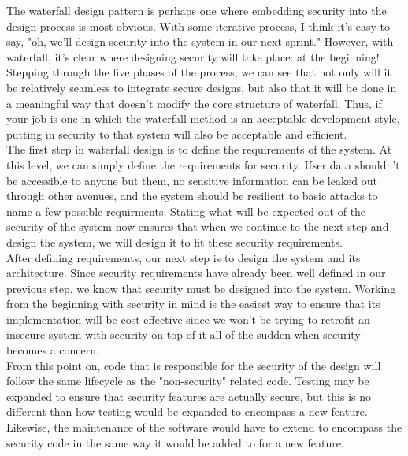 




The waterfall design pattern is perhaps one where embedding security into the design process is most obvious. With some iterative process, I think it's easy to say, "oh, we'll design security into the system in our next sprint." However, with waterfall, it's clear where designing security will take place: at the beginning! Stepping through the five phases of the process, we can see that not only will it be relatively seamless to integrate secure designs, but also that it will be done in a meaningful way that doesn't modify the core structure of waterfall. Thus, if your job is one in which the waterfall method is an acceptable development style, putting in security to that system will also be acceptable and efficient. \\

The first step in waterfall design is to define the requirements of the system. At this level, we can simply define the requirements for security. User data shouldn't be accessible to anyone but them, no sensitive information can be leaked out through other avenues, and the system should be resilient to basic attacks to name a few possible requirments. Stating what will be expected out of the security of the system now ensures that when we continue to the next step and design the system, we will design it to fit these security requirements. \\

After defining requirements, our next step is to design the system and its architecture. Since security requirements have already been well defined in our previous step, we know that security must be designed into the system. Working from the beginning with security in mind is the easiest way to ensure that its implementation will be cost effective since we won't be trying to retrofit an insecure system with security on top of it all of the sudden when security becomes a concern.  \\

From this point on, code that is responsible for the security of the design will follow the same lifecycle as the "non-security" related code. Testing may be expanded to ensure that security features are actually secure, but this is no different than how testing would be expanded to encompass a new feature. Likewise, the maintenance of the software would have to extend to encompass the security code in the same way it would be added to for a new feature. \\

